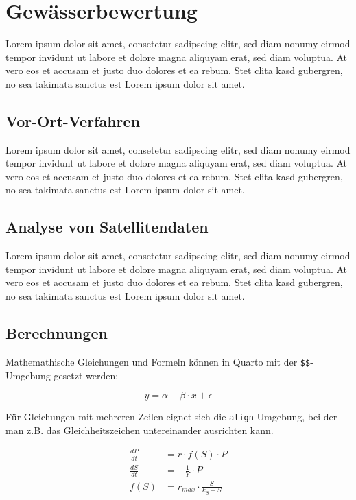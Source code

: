 \documentclass[
  11pt,
  a4paper,
]{tudscrreprt}
\begin{document}
\section{Gewässerbewertung}\label{gewuxe4sserbewertung}

Lorem ipsum dolor sit amet, consetetur sadipscing elitr, sed diam nonumy
eirmod tempor invidunt ut labore et dolore magna aliquyam erat, sed diam
voluptua. At vero eos et accusam et justo duo dolores et ea rebum. Stet
clita kasd gubergren, no sea takimata sanctus est Lorem ipsum dolor sit
amet.

\subsection{Vor-Ort-Verfahren}\label{vor-ort-verfahren}

Lorem ipsum dolor sit amet, consetetur sadipscing elitr, sed diam nonumy
eirmod tempor invidunt ut labore et dolore magna aliquyam erat, sed diam
voluptua. At vero eos et accusam et justo duo dolores et ea rebum. Stet
clita kasd gubergren, no sea takimata sanctus est Lorem ipsum dolor sit
amet.

\subsection{Analyse von
Satellitendaten}\label{analyse-von-satellitendaten}

Lorem ipsum dolor sit amet, consetetur sadipscing elitr, sed diam nonumy
eirmod tempor invidunt ut labore et dolore magna aliquyam erat, sed diam
voluptua. At vero eos et accusam et justo duo dolores et ea rebum. Stet
clita kasd gubergren, no sea takimata sanctus est Lorem ipsum dolor sit
amet.

\subsection{Berechnungen}\label{berechnungen}

Mathemathische Gleichungen und Formeln können in Quarto mit der
\texttt{\$\$}-Umgebung gesetzt werden:

\[
    y = \alpha + \beta \cdot x + \epsilon
\]

Für Gleichungen mit mehreren Zeilen eignet sich die \texttt{align}
Umgebung, bei der man z.B. das Gleichheitszeichen untereinander
ausrichten kann.

\begin{align}
\frac{dP}{dt} &= r \cdot f(S) \cdot P \\
\frac{dS}{dt} &= - \frac{1}{Y} \cdot P \\
f(S)          &= r_{max} \cdot \frac{S}{k_S + S}
\end{align}
\end{document}
